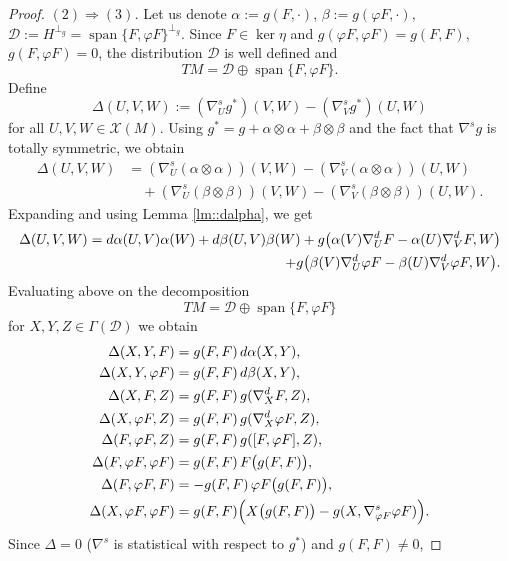 \documentclass[12pt,a4paper,final]{amsart}
\numberwithin{equation}{section}
\theoremstyle{df}
\newcommand{\X}{\mathcal{X}}
\newcommand{\XM}{\X(M)}
\newcommand{\Span}{\operatorname{span}}
\begin{document}
\begin{proof}
\noindent\emph{$(2)\Rightarrow(3)$.}
Let us denote
$\alpha:=g(F,\cdot)$, $\beta:=g(\varphi F,\cdot)$, $\mathcal D:=H^{\perp_g}=\Span\{F,\varphi F\}^{\perp_g}$.
Since $F\in\ker\eta$ and $g(\varphi F,\varphi F)=g(F,F)$, $g(F,\varphi F)=0$,
the distribution $\mathcal D$ is well defined and
$$
TM=\mathcal D\oplus \Span\{F,\varphi F\}.
$$
Define
\begin{equation}\label{eq::Delta}
\Delta(U,V,W):=(\nabla^s_Ug^\ast)(V,W)-(\nabla^s_Vg^\ast)(U,W)
\end{equation}
for all $U,V,W\in\XM$.
Using $g^\ast=g+\alpha\otimes\alpha+\beta\otimes\beta$
and the fact that $\nabla^sg$ is totally symmetric, we obtain
\begin{align*}
\Delta(U,V,W)
&=(\nabla^s_U(\alpha\otimes\alpha))(V,W)-(\nabla^s_V(\alpha\otimes\alpha))(U,W)\\
&\quad+
(\nabla^s_U(\beta\otimes\beta))(V,W)-(\nabla^s_V(\beta\otimes\beta))(U,W).
\end{align*}
Expanding and using Lemma \ref{lm::dalpha}, we get
\begin{align}
\Delta(U,V,W)
=d\alpha(U,V)\alpha(W)+d\beta(U,V)\beta(W) +
g\bigl(\alpha(V)\nabla^d_UF-\alpha(U)\nabla^d_VF,W\bigr)\notag\\
+g\bigl(\beta(V)\nabla^d_U\varphi F-\beta(U)\nabla^d_V\varphi F,W\bigr).\notag
\end{align}
Evaluating above on the decomposition
$$
TM=\mathcal D\oplus \Span\{F,\varphi F\}
$$
for $X,Y,Z\in\Gamma(\mathcal D)$
we obtain
\begin{align}
\Delta(X,Y,F)
&=g(F,F)\,d\alpha(X,Y), \label{eq::DeltaXYF}\\
\Delta(X,Y,\varphi F)
&=g(F,F)\,d\beta(X,Y), \label{eq::DeltaXYphiF}\\
\Delta(X,F,Z)
&=g(F,F)\,g(\nabla^d_XF,Z), \label{eq::DeltaXFZ}\\
\Delta(X,\varphi F,Z)
&=g(F,F)\,g(\nabla^d_X\varphi F,Z), \label{eq::DeltaXphiFZ}\\
\Delta(F,\varphi F,Z)
&=g(F,F)\,g([F,\varphi F],Z), \label{eq::DeltaFphiFZ}\\
\Delta(F,\varphi F,\varphi F)
&=g(F,F)\,F\bigl(g(F,F)\bigr), \label{eq::DeltaFphiFphiF}\\
\Delta(F,\varphi F,F)
&=-g(F,F)\,\varphi F\bigl(g(F,F)\bigr), \label{eq::DeltaFphiFF}\\
\Delta(X,\varphi F,\varphi F)
&=g(F,F)\Bigl(
X\bigl(g(F,F)\bigr)-g(X,\nabla^s_{\varphi F}\varphi F)
\Bigr). \label{eq::DeltaXphiFphiF}
\end{align}
Since $\Delta=0$ ($\nabla^s$ is statistical with respect to $g^\ast$) and $g(F,F)\neq 0$,

\end{proof}
\end{document}
